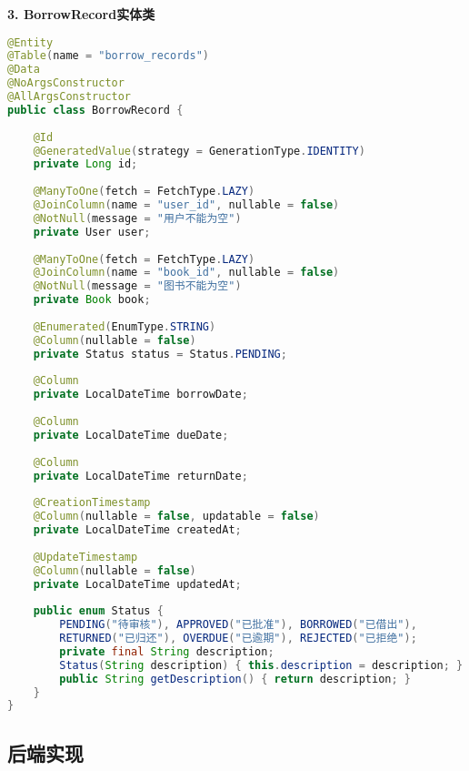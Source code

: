 \documentclass[12pt,a4paper]{article}
\begin{document}
\textbf{3. BorrowRecord实体类}
\begin{lstlisting}[language=java]
@Entity
@Table(name = "borrow_records")
@Data
@NoArgsConstructor
@AllArgsConstructor
public class BorrowRecord {
    
    @Id
    @GeneratedValue(strategy = GenerationType.IDENTITY)
    private Long id;
    
    @ManyToOne(fetch = FetchType.LAZY)
    @JoinColumn(name = "user_id", nullable = false)
    @NotNull(message = "用户不能为空")
    private User user;
    
    @ManyToOne(fetch = FetchType.LAZY)
    @JoinColumn(name = "book_id", nullable = false)
    @NotNull(message = "图书不能为空")
    private Book book;
    
    @Enumerated(EnumType.STRING)
    @Column(nullable = false)
    private Status status = Status.PENDING;
    
    @Column
    private LocalDateTime borrowDate;
    
    @Column
    private LocalDateTime dueDate;
    
    @Column
    private LocalDateTime returnDate;
    
    @CreationTimestamp
    @Column(nullable = false, updatable = false)
    private LocalDateTime createdAt;
    
    @UpdateTimestamp
    @Column(nullable = false)
    private LocalDateTime updatedAt;
    
    public enum Status {
        PENDING("待审核"), APPROVED("已批准"), BORROWED("已借出"),
        RETURNED("已归还"), OVERDUE("已逾期"), REJECTED("已拒绝");
        private final String description;
        Status(String description) { this.description = description; }
        public String getDescription() { return description; }
    }
}
\end{lstlisting}

\subsection{后端实现}
\end{document}

